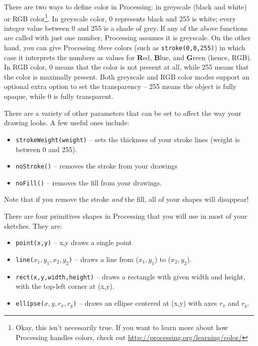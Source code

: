 There are two ways to define color in Processing: in greyscale (black and white) or RGB color\footnote{Okay, this isn't necessarily true.  If you want to learn more about how Processing handles colors, check out \url{http://processing.org/learning/color/}}.  In greyscale color, 0 represents black and 255 is white; every integer value between 0 and 255 is a shade of grey.  If any of the above functions are called with just one number, Processing assumes it is greyscale.  On the other hand, you can give Processing \emph{three} colors (such as \texttt{stroke(0,0,255)}) in which case it interprets the numbers as values for \textbf{R}ed, \textbf{B}lue, and \textbf{G}reen (hence, RGB).  In RGB color, 0 means that the color is not present at all, while 255 means that the color is maximally present.  Both greyscale and RGB color modes support an optional extra option to set the transparency -- 255 means the object is fully opaque, while 0 is fully transparent.

There are a variety of other parameters that can be set to affect the way your drawing looks.  A few useful ones include:

\begin{itemize}
\item \texttt{strokeWeight(weight)} -- sets the thickness of your stroke lines (weight is between 0 and 255).
\item \texttt{noStroke()} -- removes the stroke from your drawings
\item \texttt{noFill()} -- removes the fill from your drawings.
\end{itemize}

Note that if you remove the stroke \emph{and} the fill, all of your shapes will disappear!

There are four primitives shapes in Processing that you will use in most of your sketches.  They are:

\begin{itemize}
\item \texttt{point(x,y)} -- x,y draws a single point
\item \texttt{line($x_{1},y_{1},x_{2},y_{2}$)} -- draws a line from ($x_{1},y_{1}$) to ($x_{2},y_{2}$).
\item \texttt{rect(x,y,width,height)} -- draws a rectangle with given width and height, with the top-left corner at (x,y).
\item \texttt{ellipse($x,y,r_{x},r_{y}$)} -- draws an ellipse centered at (x,y) with axes $r_{x}$ and $r_{y}$.
\end{itemize}

